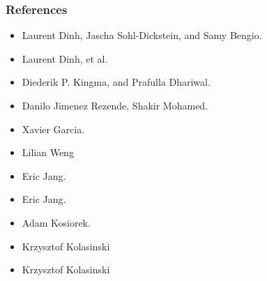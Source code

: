 \documentclass{beamer}
\begin{document}
\begin{frame}
  \frametitle{References}

  \begin{itemize}
    \item \href{https://arxiv.org/abs/1605.08803}{} {\tiny Laurent Dinh, Jascha Sohl-Dickstein, and Samy Bengio.}
    \item \href{https://arxiv.org/abs/1410.8516}{} {\tiny Laurent Dinh, et al.}
    \item \href{https://arxiv.org/abs/1807.03039}{} {\tiny Diederik P. Kingma, and Prafulla Dhariwal.}
    \item \href{https://arxiv.org/pdf/1505.05770.pdf}{} {\tiny Danilo Jimenez Rezende, Shakir Mohamed.}
    \item \href{https://github.com/darthdeus/LML-basement/blob/master/notes/Glow_Notes.pdf}{} {\tiny Xavier Garcia.}

    \item \href{https://lilianweng.github.io/lil-log/2018/10/13/flow-based-deep-generative-models.htm}{} {\tiny Lilian Weng}
    \item \href{https://blog.evjang.com/2018/01/nf1.html}{} {\tiny Eric Jang.}
    \item \href{https://blog.evjang.com/2018/01/nf2.html}{} {\tiny Eric Jang.}
    \item \href{http://akosiorek.github.io/ml/2018/04/03/norm_flows.html}{} {\tiny Adam Kosiorek.}
    \item \href{https://github.com/kmkolasinski/deep-learning-notes/tree/master/seminars/2018-09-Introduction-to-Normalizing-Flows}{} {\tiny Krzysztof Kolasinski}
    \item \href{https://github.com/kmkolasinski/deep-learning-notes/tree/master/seminars/2018-10-Normalizing-Flows-NICE-RealNVP-GLOW}{} {\tiny Krzysztof Kolasinski}
  \end{itemize}
\end{frame}
\end{document}
